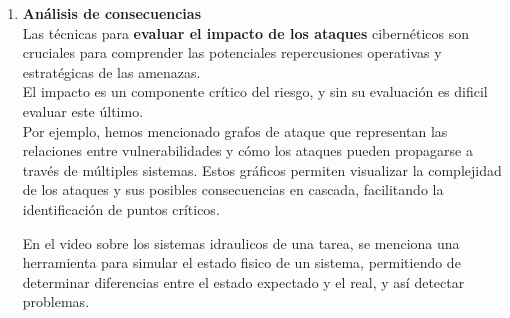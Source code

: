 \begin{enumerate}[resume]
\item \textbf{Análisis de consecuencias} \\
Las técnicas para \textbf{evaluar el impacto de los ataques} cibernéticos son cruciales para comprender las potenciales repercusiones operativas y estratégicas de las amenazas.\\
El impacto es un componente crítico del riesgo, y sin su evaluación es dificil evaluar este último.\\
Por ejemplo, hemos mencionado grafos de ataque que representan las relaciones entre vulnerabilidades y cómo los ataques pueden propagarse a través de múltiples sistemas. Estos gráficos permiten visualizar la complejidad de los ataques y sus posibles consecuencias en cascada, facilitando la identificación de puntos críticos.


En el video sobre los sistemas idraulicos de una tarea, se menciona una herramienta para simular el estado fisico de un sistema, permitiendo de determinar diferencias entre el estado expectado y el real, y así detectar problemas.
\end{enumerate}

\newpage
